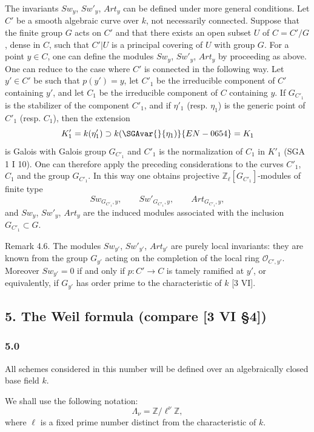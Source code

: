 The invariants $Sw_y$, $Sw'_y$, $Art_y$ can be defined under more general conditions. Let $C'$ be a smooth algebraic curve over $k$, not necessarily connected. Suppose that the finite group $G$ acts on $C'$ and that there exists an open subset $U$ of $C=C'/G$, dense in $C$, such that $C'|U$ is a principal covering of $U$ with group $G$. For a point $y\in C$, one can define the modules $Sw_y$, $Sw'_y$, $Art_y$ by proceeding as above. One can reduce to the case where $C'$ is connected in the following way. Let $y'\in C'$ be such that $p(y')=y$, let $C'_1$ be the irreducible component of $C'$ containing $y'$, and let $C_1$ be the irreducible component of $C$ containing $y$. If $G_{C'_1}$ is the stabilizer of the component $C'_1$, and if $\eta'_1$ (resp. $\eta_1$) is the generic point of $C'_1$ (resp. $C_1$), then the extension
\[
K'_1=k(\eta'_1)\supset k(\SGAvar{}{\eta_1)}{EN-0654}=K_1
\]
is Galois with Galois group $G_{C'_1}$ and $C'_1$ is the normalization of $C_1$ in $K'_1$ (SGA 1 I 10). One can therefore apply the preceding considerations to the curves $C'_1$, $C_1$ and the group $G_{C'_1}$. In this way one obtains projective $\mathbb Z_\ell[G_{C'_1}]$-modules of finite type
\[
Sw_{G_{C'_1},y},\qquad Sw'_{G_{C'_1},y},\qquad Art_{G_{C'_1},y},
\]
and $Sw_y$, $Sw'_y$, $Art_y$ are the induced modules associated with the inclusion $G_{C'_1}\subset G$.

Remark 4.6. The modules $Sw_{y'}$, $Sw'_{y'}$, $Art_{y'}$ are purely local invariants: they are known from the group $G_{y'}$ acting on the completion of the local ring $\mathcal O_{C',y'}$. Moreover $Sw_{y'}=0$ if and only if $p:C'\to C$ is tamely ramified at $y'$, or equivalently, if $G_{y'}$ has order prime to the characteristic of $k$ [3 VI].

\subsection*{5. The Weil formula (compare [3 VI §4])}

\subsubsection*{5.0}

All schemes considered in this number will be defined over an algebraically closed base field $k$.

We shall use the following notation:
\[
\Lambda_\nu=\mathbb Z/\ell^\nu\mathbb Z,
\]
where $\ell$ is a fixed prime number distinct from the characteristic of $k$.

